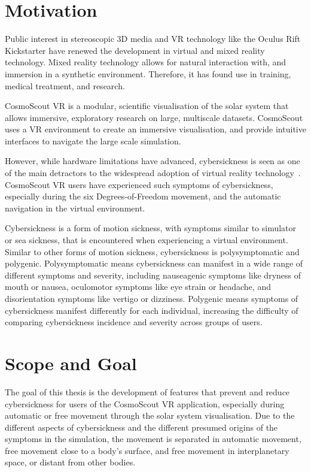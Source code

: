 \section{Motivation}\label{sec:motivation}

Public interest in stereoscopic 3D media and VR technology like the Oculus Rift Kickstarter have renewed the
development in virtual and mixed reality technology.
Mixed reality technology allows for natural interaction with, and immersion in a synthetic environment.
Therefore, it has found use in training, medical treatment, and research.

CosmoScout VR is a modular, scientific visualisation of the solar system that allows immersive, exploratory research
on large, multiscale datasets.
CosmoScout uses a VR environment to create an immersive visualisation, and provide intuitive interfaces to navigate
the large scale simulation.

However, while hardware limitations have advanced, cybersickness is seen as one of the main detractors to the
widespread adoption of virtual reality technology~\cite{Rebenitsch2016}.
CosmoScout VR users have experienced such symptoms of cybersickness, especially during the six Degrees-of-Freedom
movement, and the automatic navigation in the virtual environment.

Cybersickness is a form of motion sickness, with symptoms similar to simulator or sea sickness, that is encountered
when experiencing a virtual environment.
Similar to other forms of motion sickness, cybersickness is polysymptomatic and polygenic.
Polysymptomatic means cybersickness can manifest in a wide range of different symptoms and severity, including
nauseagenic symptoms like dryness of mouth or nausea, oculomotor symptoms like eye strain or headache, and
disorientation symptoms like vertigo or dizziness.
Polygenic means symptoms of cybersickness manifest differently for each individual, increasing the difficulty of
comparing cybersickness incidence and severity across groups of users.


\section{Scope and Goal}\label{sec:scope-and-goal}

The goal of this thesis is the development of features that prevent and reduce cybersickness for users of the
CosmoScout VR application, especially during automatic or free movement through the solar system visualisation.
Due to the different aspects of cybersickness and the different presumed origins of the symptoms in the simulation,
the movement is separated in automatic movement, free movement close to a body's surface, and free movement in
interplanetary space, or distant from other bodies.

